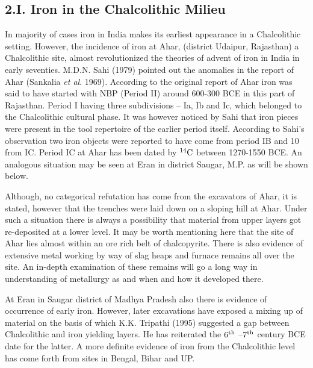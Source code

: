 \vspace{-.48cm}

\subsection*{2.I. Iron in the Chalcolithic Milieu}\label{chapter3-subsection-4}

\vspace{-.2cm}

In majority of cases iron in India makes its earliest appearance in a Chalcolithic setting. However, the incidence of iron at Ahar, (district Udaipur, Rajasthan) a Chalcolithic site, almost revolutionized the theories of advent of iron in India in early seventies. M.D.N. Sahi (1979) pointed out the anomalies in the report of Ahar (Sankalia \textit{et al}. 1969). According to the original report of Ahar iron was said to have started with NBP (Period II) around 600-300 BCE in this part of Rajasthan. Period I having three subdivisions – Ia, Ib and Ic, which belonged to the Chalcolithic cultural phase. It was however noticed by Sahi that iron pieces were present in the tool repertoire of the earlier period itself. According to Sahi’s observation two iron objects were reported to have come from period IB and 10 from IC. Period IC at Ahar has been dated by $^{14}{\rm C}$ between 1270-1550 BCE. An analogous situation may be seen at Eran in district Saugar, M.P. as will be shown below.

Although, no categorical refutation has come from the excavators of Ahar, it is stated, however that the trenches were laid down on a sloping hill at Ahar. Under such a situation there is always a possibility that material from upper layers got re-deposited at a lower level. It may be worth mentioning here that the site of Ahar lies almost within an ore rich belt of chalcopyrite. There is also evidence of extensive metal working by way of slag heaps and furnace remains all over the site. An in-depth examination of these remains will go a long way in understanding of metallurgy as and when and how it developed there.

At Eran in Saugar district of Madhya Pradesh also there is evidence of occurrence of early iron. However, later excavations have exposed a mixing up of material on the basis of which K.K. Tripathi (1995) suggested a gap between Chalcolithic and iron yielding layers. He has reiterated the $6^{\rm th}$ –$7^{\rm th}$ century BCE date for the latter. A more definite evidence of iron from the Chalcolithic level has come forth from sites in Bengal, Bihar and UP.

